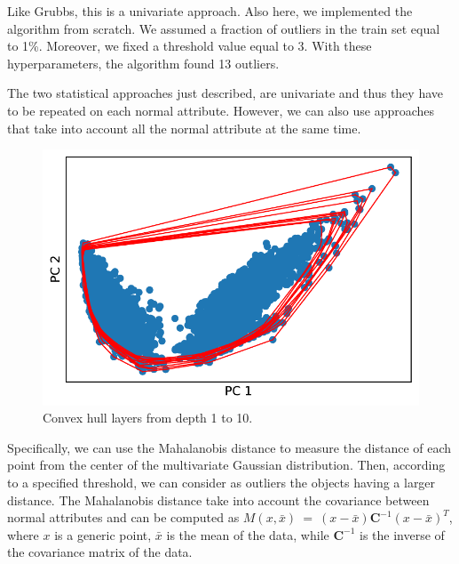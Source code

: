 \documentclass[10pt, a4paper, twocolumn]{article}
\begin{document}
Like Grubbs, this is a univariate approach. Also here, we implemented the algorithm from scratch. We assumed a fraction of outliers in the train set equal to 1\%. Moreover, we fixed a threshold value equal to 3. With these hyperparameters, the algorithm found 13 outliers.

The two statistical approaches just described, are univariate and thus they have to be repeated on each normal attribute. However, we can also use approaches that take into account all the normal attribute at the same time.

\begin{figure}
    \centering
    \includegraphics[width=0.6\linewidth]{immagini simone/output_75_0.pdf}
    \caption{Convex hull layers from depth 1 to 10.}
    \label{fig:convex_hull}
\end{figure}

Specifically, we can use the Mahalanobis distance to measure the distance of each point from the center of the multivariate Gaussian distribution. Then, according to a specified threshold, we can consider as outliers the objects having a larger distance. The Mahalanobis distance take into account the covariance between normal attributes and can be computed as $M(x, \bar{x})~=~(x- \bar{x})\boldsymbol{C}^{-1}(x - \bar{x})^T$, where $x$ is a generic point, $\bar{x}$ is the mean of the data, while $\boldsymbol{C}^{-1}$ is the inverse of the covariance matrix of the data. 
\end{document}
